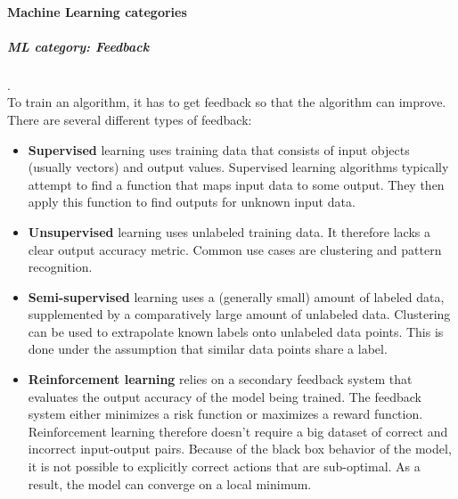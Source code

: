 \paragraph{Machine Learning categories}
\subparagraph{ML category: Feedback}
.\\
To train an algorithm, it has to get feedback so that the algorithm can improve. There are several different types of feedback:
\begin{itemize}
	\item \textbf{Supervised}
		learning uses training data that consists of input objects (usually vectors) and output values. Supervised learning algorithms typically attempt to find a function that maps input data to some output. They then apply this function to find outputs for unknown input data.
	\item \textbf{Unsupervised}
		learning uses unlabeled training data. It therefore lacks a clear output accuracy metric. Common use cases are clustering and pattern recognition.
	\item \textbf{Semi-supervised}
		learning uses a (generally small) amount of labeled data, supplemented by a comparatively large amount of unlabeled data. Clustering can be used to extrapolate known labels onto unlabeled data points. This is done under the assumption that similar data points share a label.
	\item \textbf{Reinforcement learning}
		relies on a secondary feedback system that evaluates the output accuracy of the model being trained. The feedback system either minimizes a risk function or maximizes a reward function. Reinforcement learning therefore doesn't require a big dataset of correct and incorrect input-output pairs. Because of the black box behavior of the model, it is not possible to explicitly correct actions that are sub-optimal. As a result, the model can converge on a local minimum.
\end{itemize}

